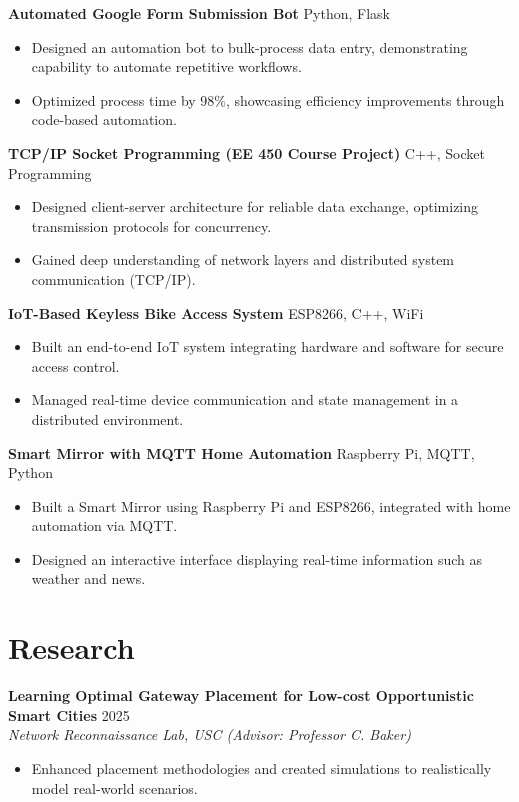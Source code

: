 \documentclass[letterpaper,10pt]{article}
\begin{document}
\textbf{Automated Google Form Submission Bot} \hfill Python, Flask
\begin{itemize}[leftmargin=*,noitemsep,topsep=-2pt]
    \item Designed an automation bot to bulk-process data entry, demonstrating capability to automate repetitive workflows.
    \item Optimized process time by 98\%, showcasing efficiency improvements through code-based automation.
\end{itemize}

\textbf{TCP/IP Socket Programming (EE 450 Course Project)} \hfill C++, Socket Programming
\begin{itemize}[leftmargin=*,noitemsep,topsep=-2pt]
    \item Designed client-server architecture for reliable data exchange, optimizing transmission protocols for concurrency.
    \item Gained deep understanding of network layers and distributed system communication (TCP/IP).
\end{itemize}

\textbf{IoT-Based Keyless Bike Access System} \hfill ESP8266, C++, WiFi
\begin{itemize}[leftmargin=*,noitemsep,topsep=-2pt]
    \item Built an end-to-end IoT system integrating hardware and software for secure access control.
    \item Managed real-time device communication and state management in a distributed environment.
\end{itemize}

\textbf{Smart Mirror with MQTT Home Automation} \hfill Raspberry Pi, MQTT, Python
\begin{itemize}[leftmargin=*,noitemsep,topsep=-2pt]
    \item Built a Smart Mirror using Raspberry Pi and ESP8266, integrated with home automation via MQTT.
    \item Designed an interactive interface displaying real-time information such as weather and news.
\end{itemize}

\section*{Research}
\textbf{Learning Optimal Gateway Placement for Low-cost Opportunistic Smart Cities} \hfill 2025 \\
\textit{Network Reconnaissance Lab, USC (Advisor: Professor C. Baker)}
\begin{itemize}[leftmargin=*,noitemsep,topsep=-2pt]
    \item Enhanced placement methodologies and created simulations to realistically model real-world scenarios.
\end{itemize}
\end{document}
